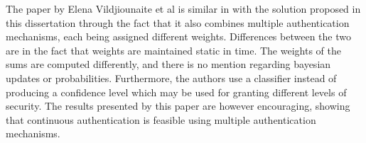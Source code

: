 The paper by Elena Vildjiounaite et al \cite{vildjiounaite2007increasing} is similar in with the solution proposed in this dissertation through the fact that it also combines multiple authentication mechanisms, each being assigned different weights. Differences between the two are in the fact that weights are maintained static in time. The weights of the sums are computed differently, and there is no mention regarding bayesian updates or probabilities. Furthermore, the authors use a classifier instead of producing a confidence level which may be used for granting different levels of security. The results presented by this paper are however encouraging, showing that continuous authentication is feasible using multiple authentication mechanisms.
